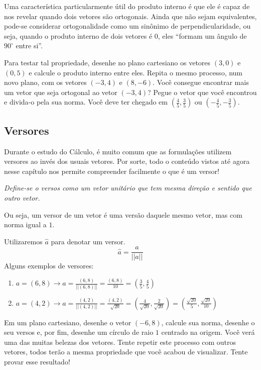 \documentclass[
  letterpaper,
  DIV=11,
  numbers=noendperiod]{scrreprt}
\providecommand{\tightlist}{%
  \setlength{\itemsep}{0pt}\setlength{\parskip}{0pt}}\usepackage{longtable,booktabs,array}
\begin{document}
Uma característica particularmente útil do produto interno é que ele é
capaz de nos revelar quando dois vetores são ortogonais. Ainda que não
sejam equivalentes, pode-se considerar ortogonalidade como um sinônimo
de perpendicularidade, ou seja, quando o produto interno de dois vetores
é 0, eles ``formam um ângulo de \(90^{\circ}\) entre si''.

Para testar tal propriedade, desenhe no plano cartesiano os vetores
\((3,0)\) e \((0,5)\) e calcule o produto interno entre eles. Repita o
mesmo processo, num novo plano, com os vetores \((-3,4)\) e \((8,-6)\).
Você consegue encontrar mais um vetor que seja ortogonal ao vetor
\((-3,4)\)? Pegue o vetor que você encontrou e divida-o pela sua norma.
Você deve ter chegado em \((\frac{4}{5}, \frac{3}{5})\) ou
\((-\frac{4}{5}, -\frac{3}{5})\).

\subsection{Versores}\label{versores}

Durante o estudo do Cálculo, é muito comum que as formulações utilizem
versores ao invés dos usuais vetores. Por sorte, todo o conteúdo vistos
até agora nesse capítulo nos permite compreender facilmente o que é um
versor!

\emph{Define-se o versos como um vetor unitário que tem mesma direção e
sentido que outro vetor.}

Ou seja, um versor de um vetor é uma versão daquele mesmo vetor, mas com
norma igual a \(1\).

Utilizaremos \(\hat{a}\) para denotar um versor. \[
\hat{a}=\frac{a}{||a||}
\] Alguns exemplos de versores:

\begin{enumerate}
\def\labelenumi{\arabic{enumi}.}
\tightlist
\item
  \(a = (6,8) \rightarrow \hat{a} = \frac{(6,8)}{||(6,8)||}=\frac{(6,8)}{10} = (\frac{3}{5}, \frac{4}{5})\)
\item
  \(a = (4,2) \rightarrow \hat{a} = \frac{(4,2)}{||(4,2)||}=\frac{(4,2)}{\sqrt{20}} = (\frac{4}{\sqrt{20}},
   \frac{2}{\sqrt{20}})=(\frac{\sqrt{20}}{5}, \frac{\sqrt{20}}{10})\)
\end{enumerate}

Em um plano cartesiano, desenhe o vetor \((-6,8)\), calcule sua norma,
desenhe o seu versos e, por fim, desenhe um círculo de raio \(1\)
centrado na origem. Você verá uma das muitas belezas dos vetores. Tente
repetir este processo com outros vetores, todos terão a mesma
propriedade que você acabou de visualizar. Tente provar esse resultado!
\end{document}
